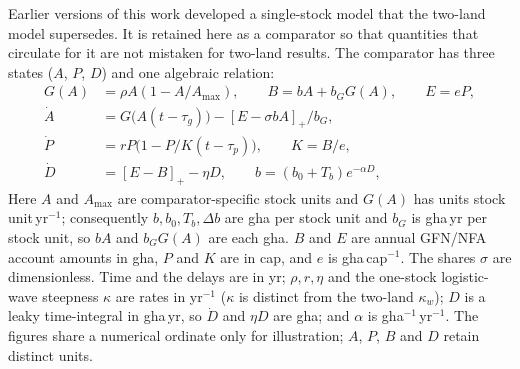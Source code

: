 \documentclass[11pt,a4paper]{article}
\newcommand{\pos}[1]{\left[#1\right]_+}
\begin{document}
Earlier versions of this work developed a single-stock model that the two-land model supersedes. It is retained here as a comparator so that quantities that circulate for it are not mistaken for two-land results. The comparator has three states ($A$, $P$, $D$) and one algebraic relation:
\begin{align}
G(A)&=\rho A(1-A/A_{\max}),\qquad B=bA+b_GG(A),\qquad E=eP,\\
\dot A&=G\big(A(t-\tau_g)\big)-\pos{E-\sigma bA}/b_G,\\
\dot P&=rP\big(1-P/K(t-\tau_p)\big),\qquad K=B/e,\\
\dot D&=\pos{E-B}-\eta D,\qquad b=(b_0+T_b)e^{-\alpha D},
\end{align}
Here $A$ and $A_{\max}$ are comparator-specific stock units and $G(A)$ has units stock unit\,yr$^{-1}$; consequently $b,b_0,T_b,\Delta b$ are gha per stock unit and $b_G$ is gha\,yr per stock unit, so $bA$ and $b_GG(A)$ are each gha. $B$ and $E$ are annual GFN/NFA account amounts in gha, $P$ and $K$ are in cap, and $e$ is gha\,cap$^{-1}$. The shares $\sigma$ are dimensionless. Time and the delays are in yr; $\rho,r,\eta$ and the one-stock logistic-wave steepness $\kappa$ are rates in yr$^{-1}$ ($\kappa$ is distinct from the two-land $\kappa_w$); $D$ is a leaky time-integral in gha\,yr, so $\dot D$ and $\eta D$ are gha; and $\alpha$ is gha$^{-1}$\,yr$^{-1}$. The figures share a numerical ordinate only for illustration; $A$, $P$, $B$ and $D$ retain distinct units.
\end{document}
